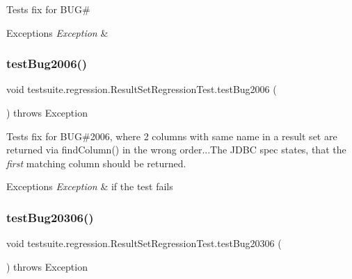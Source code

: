 Tests fix for B\+UG\#


\begin{DoxyExceptions}{Exceptions}
{\em Exception} & \\
\hline
\end{DoxyExceptions}
\mbox{\label{classtestsuite_1_1regression_1_1_result_set_regression_test_a629011171ee3f908eb188d2f9ad1ea35}} 
\subsubsection{\texorpdfstring{test\+Bug2006()}{testBug2006()}}
{\footnotesize\ttfamily void testsuite.\+regression.\+Result\+Set\+Regression\+Test.\+test\+Bug2006 (\begin{DoxyParamCaption}{ }\end{DoxyParamCaption}) throws Exception}

Tests fix for B\+UG\#2006, where 2 columns with same name in a result set are returned via find\+Column() in the wrong order...The J\+D\+BC spec states, that the {\itshape first} matching column should be returned.


\begin{DoxyExceptions}{Exceptions}
{\em Exception} & if the test fails \\
\hline
\end{DoxyExceptions}
\mbox{\label{classtestsuite_1_1regression_1_1_result_set_regression_test_a676f6934dd6986c57deb1da3920d7240}} 
\subsubsection{\texorpdfstring{test\+Bug20306()}{testBug20306()}}
{\footnotesize\ttfamily void testsuite.\+regression.\+Result\+Set\+Regression\+Test.\+test\+Bug20306 (\begin{DoxyParamCaption}{ }\end{DoxyParamCaption}) throws Exception}

